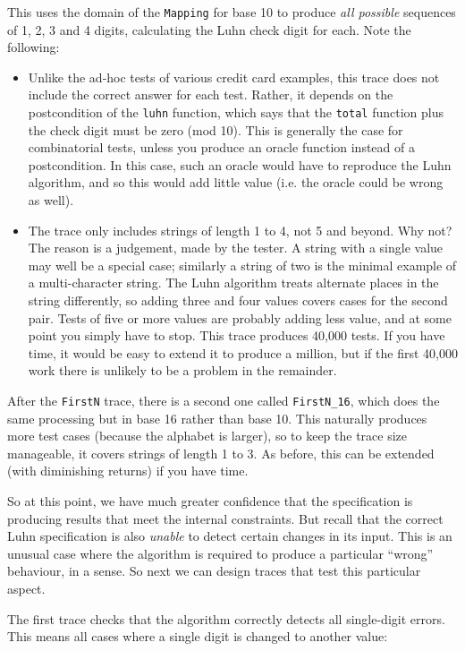 \documentclass{overturerepchap}
\begin{document}
\noindent This uses the domain of the \texttt{Mapping} for base 10 to produce
\emph{all possible} sequences of 1, 2, 3 and 4 digits, calculating the Luhn
check digit for each. Note the following:

\begin{itemize}
	\item Unlike the ad-hoc tests of various credit card examples, this trace does
	not include the correct answer for each test. Rather, it depends on the
	postcondition of the \texttt{luhn} function, which says that the \texttt{total}
	function plus the check digit must be zero (mod 10). This is generally the case
	for combinatorial tests, unless you produce an oracle function instead of a
	postcondition. In this case, such an oracle would have to reproduce the Luhn
	algorithm, and so this would add little value (i.e. the oracle could be wrong
	as well).
	\item The trace only includes strings of length 1 to 4, not 5 and beyond. Why
	not? The reason is a judgement, made by the tester. A string with a single value
	may well be a special case; similarly a string of two is the minimal example of
	a multi-character string. The Luhn algorithm treats alternate places in the
	string differently, so adding three and four values covers cases for the second
	pair. Tests of five or more values are probably adding less value, and at
	some point you simply have to stop. This trace produces 40,000 tests. If you
	have time, it would be easy to extend it to produce a million, but if the first
	40,000 work there is unlikely to be a problem in the remainder.
\end{itemize}

After the \texttt{FirstN} trace, there is a second one called
\texttt{FirstN\_16}, which does the same processing but in base 16 rather than
base 10. This naturally produces more test cases (because the alphabet is
larger), so to keep the trace size manageable, it covers strings of length 1 to
3. As before, this can be extended (with diminishing returns) if you have time.

So at this point, we have much greater confidence that the specification is
producing results that meet the internal constraints. But recall that the
correct Luhn specification is also \emph{unable} to detect certain changes in
its input. This is an unusual case where the algorithm is required to produce a
particular ``wrong'' behaviour, in a sense. So next we can design traces that
test this particular aspect.

The first trace checks that the algorithm correctly detects all single-digit
errors. This means all cases where a single digit is changed to another value:
\end{document}
